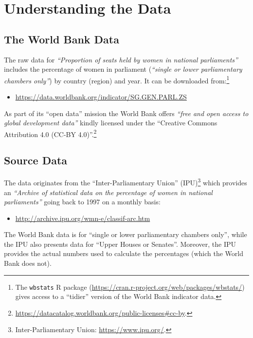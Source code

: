 \documentclass[a4paper,9pt,twocolumn,twoside,printwatermark=true]{pinp}
\providecommand{\tightlist}{%
  \setlength{\itemsep}{0pt}\setlength{\parskip}{0pt}}
\begin{document}
\section{Understanding the Data}\label{understanding-the-data}

\subsection{The World Bank Data}\label{the-world-bank-data}

The raw data for \emph{``Proportion of seats held by women in national
parliaments''} includes the percentage of women in parliament
(\emph{``single or lower parliamentary chambers only''}) by country
(region) and year. It can be downloaded from:\footnote{The
  \texttt{wbstats} R package
  (\url{https://cran.r-project.org/web/packages/wbstats/}) gives access
  to a ``tidier'' version of the World Bank indicator data.}

\begin{itemize}
\tightlist
\item
  \url{https://data.worldbank.org/indicator/SG.GEN.PARL.ZS}
\end{itemize}

As part of its ``open data'' mission the World Bank offers \emph{``free
and open access to global development data''} kindly licensed under the
``Creative Commons Attribution 4.0 (CC-BY 4.0)''.\footnote{\url{https://datacatalog.worldbank.org/public-licenses\#cc-by}.}

\subsection{Source Data}\label{source-data}

The data originates from the ``Inter-Parliamentary Union''
(IPU)\footnote{Inter-Parliamentary Union: \url{https://www.ipu.org/}.}
which provides an \emph{\emph{``Archive of statistical data on the
percentage of women in national parliaments''}} going back to 1997 on a
monthly basis:

\begin{itemize}
\tightlist
\item
  \url{http://archive.ipu.org/wmn-e/classif-arc.htm}
\end{itemize}

The World Bank data is for ``single or lower parliamentary chambers
only'', while the IPU also presents data for ``Upper Houses or
Senates''. Moreover, the IPU provides the actual numbers used to
calculate the percentages (which the World Bank does not).
\end{document}
